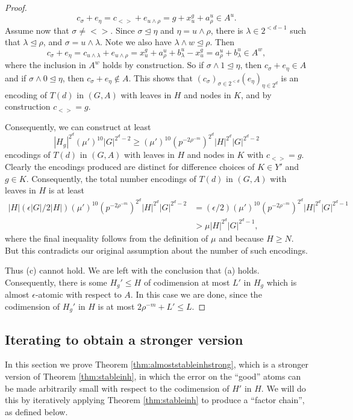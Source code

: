 \documentclass[12pt,oneside,british,a4wide]{amsart}
\numberwithin{equation}{section}
\theoremstyle{definition}
\def\e{\epsilon}
\begin{document}
\begin{proof}
$$
c_{\sigma}+e_{\eta}=c_{<>}+e_{u\wedge\rho}=g+x^g_u+a^u_{\rho}\in A^u.
$$
Assume now that $\sigma \neq <>$.  Since $\sigma\trianglelefteq \eta$ and $\eta=u\wedge \rho$, there is $\lambda\in 2^{<d-1}$ such that $\lambda\trianglelefteq \rho$, and $\sigma=u\wedge \lambda$.  Note we also have $\lambda\wedge w\trianglelefteq \rho$.  Then
$$
c_{\sigma}+e_{\eta}=c_{u\wedge\lambda}+e_{u\wedge\rho}= x^g_u+a^u_{\rho}+b^u_{\lambda}-x^g_u=a^u_{\rho}+b^u_{\lambda}\in A^w,
$$
where the inclusion in $A^w$ holds by construction.   So if $\sigma\wedge 1\trianglelefteq \eta$, then $c_{\sigma}+e_{\eta}\in A$ and if $\sigma\wedge 0\trianglelefteq \eta$, then $c_{\sigma}+e_{\eta}\notin A$.  This shows that $(c_{\sigma})_{\sigma\in 2^{<d}}(e_{\eta})_{\eta\in 2^d}$ is an encoding of $T(d)$ in $(G,A)$ with leaves in $H$ and nodes in $K$, and by construction $c_{<>}=g$.

Consequently, we can construct at least 
\[|H_g|^{2^{d}} (\mu')^{10} |G|^{2^{d}-2}\geq (\mu')^{10}(p^{-2\rho^{-m}})^{2^d}|H|^{2^{d}}|G|^{2^{d}-2}\]
encodings of $T(d)$ in $(G,A)$ with leaves in $H$ and nodes in $K$ with  $c_{<>}=g$. Clearly the encodings produced are distinct for difference choices of $K\in Y'$ and $g\in K$.  Consequently, the total number encodings of $T(d)$ in $(G,A)$ with leaves in $H$ is at least 
\begin{align*}
|H| (\e|G|/2|H|)(\mu')^{10}(p^{-2\rho^{-m}})^{2^d}|H|^{2^{d}}|G|^{2^{d}-2}&=(\e/2) (\mu')^{10}(p^{-2\rho^{-m}})^{2^d}|H|^{2^{d}}|G|^{2^{d}-1}\\
&> \mu|H|^{2^d}|G|^{2^d-1},
\end{align*}
where the final inequality follows from the definition of $\mu$ and because $H\geq N$. But this contradicts our original assumption about the number of such encodings. 

Thus (c) cannot hold.  We are left with the conclusion that (a) holds.  Consequently, there is some $H_g'\leqslant H$ of codimension at most $L'$ in $H_g$ which is almost $\e$-atomic with respect to $A$.  In this case we are done, since the codimension of $H_g'$ in $H$ is at most $2\rho^{-m}+L'\leq L$.  
\end{proof}

\subsection{Iterating to obtain a stronger version}\label{subsec:iterate}

In this section we prove Theorem \ref{thm:almoststableinhstrong}, which is a stronger version of Theorem \ref{thm:stableinh}, in which the error on the ``good'' atoms can be made arbitrarily small with respect to the codimension of $H'$ in $H$.  We will do this by iteratively applying Theorem \ref{thm:stableinh} to produce a ``factor chain'', as defined below.
\end{document}
